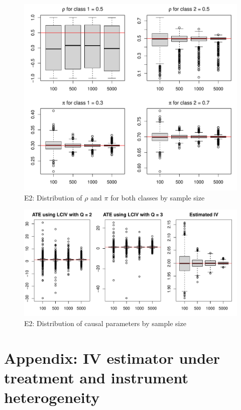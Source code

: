 \documentclass[12pt]{article}
\begin{document}
\begin{figure}[H]
	\caption{E2: Distribution of $\rho$  and $\pi$ for both classes by sample size}\label{fig:figure-A3}
	\centering
	\includegraphics[width =\textwidth]{fig2c-1} 
\end{figure}

\begin{figure}[H]
	\caption{E2: Distribution of causal parameters by sample size}\label{fig:figure-A4}
	\centering
	\includegraphics[width =\textwidth]{fig3c-1} 
\end{figure}




\section{Appendix: IV estimator under treatment and instrument heterogeneity}\label{app:iv-het}
\end{document}

